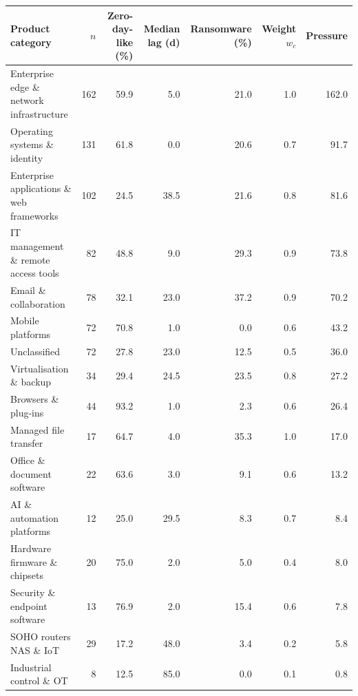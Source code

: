 \begin{tabular}{lrrrrrr}
\toprule
Product category & $n$ & Zero-day-like (\%) & Median lag (d) & Ransomware (\%) & Weight $w_c$ & Pressure \\
\midrule
Enterprise edge \& network infrastructure & 162 & 59.9 & 5.0 & 21.0 & 1.0 & 162.0 \\
Operating systems \& identity & 131 & 61.8 & 0.0 & 20.6 & 0.7 & 91.7 \\
Enterprise applications \& web frameworks & 102 & 24.5 & 38.5 & 21.6 & 0.8 & 81.6 \\
IT management \& remote access tools & 82 & 48.8 & 9.0 & 29.3 & 0.9 & 73.8 \\
Email \& collaboration & 78 & 32.1 & 23.0 & 37.2 & 0.9 & 70.2 \\
Mobile platforms & 72 & 70.8 & 1.0 & 0.0 & 0.6 & 43.2 \\
Unclassified & 72 & 27.8 & 23.0 & 12.5 & 0.5 & 36.0 \\
Virtualisation \& backup & 34 & 29.4 & 24.5 & 23.5 & 0.8 & 27.2 \\
Browsers \& plug-ins & 44 & 93.2 & 1.0 & 2.3 & 0.6 & 26.4 \\
Managed file transfer & 17 & 64.7 & 4.0 & 35.3 & 1.0 & 17.0 \\
Office \& document software & 22 & 63.6 & 3.0 & 9.1 & 0.6 & 13.2 \\
AI \& automation platforms & 12 & 25.0 & 29.5 & 8.3 & 0.7 & 8.4 \\
Hardware firmware \& chipsets & 20 & 75.0 & 2.0 & 5.0 & 0.4 & 8.0 \\
Security \& endpoint software & 13 & 76.9 & 2.0 & 15.4 & 0.6 & 7.8 \\
SOHO routers NAS \& IoT & 29 & 17.2 & 48.0 & 3.4 & 0.2 & 5.8 \\
Industrial control \& OT & 8 & 12.5 & 85.0 & 0.0 & 0.1 & 0.8 \\
\bottomrule
\end{tabular}